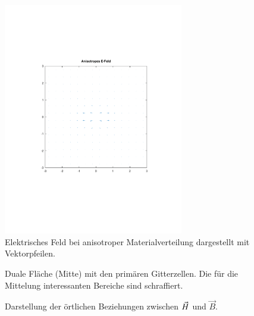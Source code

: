 \documentclass[Protokollheft.tex]{subfiles}
\begin{document}
\begin{figure}[h!]
	\centering
	\includegraphics[trim = 10mm 60mm 10mm 50mm, clip, width=0.7\textwidth]{efield_4.pdf}
	\caption{Elektrisches Feld bei anisotroper Materialverteilung dargestellt mit Vektorpfeilen.}
	\label{Abb:72}
\end{figure}
\begin{figure}[h!]
	\centering
	\def\svgwidth{0.5\textwidth}
	
	\caption{Duale Fläche (Mitte) mit den primären Gitterzellen. Die für die Mittelung interessanten Bereiche sind schraffiert.}
	\label{Abb:A1}
\end{figure}
\begin{figure}[h!]
	\centering
	\def\svgwidth{0.5\textwidth}
	
	\caption{Darstellung der örtlichen Beziehungen zwischen $ \vec{H} $ und $\vec{B}$.}
	\label{Abb:A2}
\end{figure}
\end{document}
